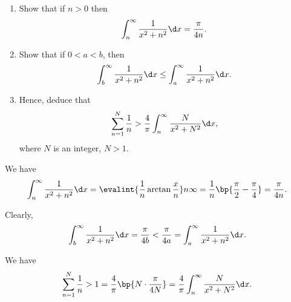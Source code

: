 \begin{problem}
    \begin{enumerate}
        \item Show that if $n > 0$ then \[\int_n^\infty \frac1{x^2 + n^2} \d x = \frac\pi{4n}.\]
        \item Show that if $0 < a < b$, then \[\int_b^\infty \frac1{x^2 + n^2} \d x \leq \int_a^\infty \frac1{x^2 + n^2 } \d x.\]
        \item Hence, deduce that \[\sum_{n = 1}^N \frac1n > \frac4\pi \int_n^\infty \frac{N}{x^2 + N^2} \d x,\] where $N$ is an integer, $N > 1$.
    \end{enumerate}
\end{problem}
\begin{solution}
    \begin{ppart}
        We have \[\int_n^\infty \frac1{x^2 + n^2} \d x = \evalint{\frac1n \arctan \frac{x}{n}}n{\infty} = \frac1n \bp{\frac\pi2 - \frac\pi4} = \frac{\pi}{4n}.\]
    \end{ppart}
    \begin{ppart}
        Clearly, \[\int_b^\infty \frac1{x^2 + n^2} \d x = \frac{\pi}{4b} < \frac{\pi}{4a} = \int_a^\infty \frac1{x^2 + n^2 } \d x.\]
    \end{ppart}
    \begin{ppart}
        We have \[\sum_{n = 1}^N \frac1n > 1 = \frac{4}{\pi} \bp{N \cdot \frac\pi{4N}} = \frac4\pi \int_n^\infty \frac{N}{x^2 + N^2} \d x.\]
    \end{ppart}
\end{solution}


